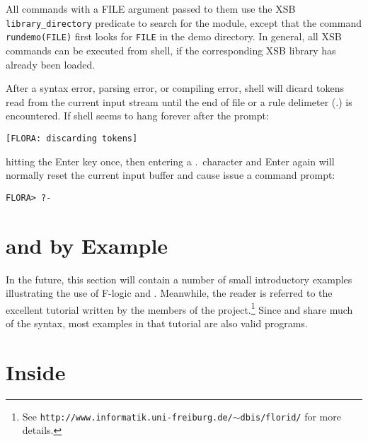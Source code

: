 \documentclass[11pt]{report}
\begin{document}
\addtocounter{footnote}{-3}
\addtocounter{footnote}{1}
\addtocounter{footnote}{1}
\addtocounter{footnote}{1}

All commands with a FILE argument passed to them use the XSB {\tt library\_directory}
predicate to search for the module, except that the command {\tt rundemo(FILE)}
first looks for {\tt FILE} in the \FLORA demo directory. In general, all XSB commands
can be executed from \FLORA shell, if the corresponding XSB library has already been
loaded.

After a syntax error, parsing error, or compiling error, \FLORA shell will
dicard tokens read from the current input stream until the end of file or a
rule delimeter (.) is encountered. If \FLORA shell seems to hang forever
after the prompt:
\begin{verbatim}
[FLORA: discarding tokens]
\end{verbatim}
hitting the Enter key once, then entering a .\ character and Enter again
will normally reset the current input buffer and cause \FLORA issue a
command prompt:
\begin{verbatim}
FLORA> ?-
\end{verbatim}

 
\section{\fl and \FLORA by Example}

In the future, this section will contain a number of small
introductory examples illustrating the use of F-logic and \FLORA. Meanwhile, the
reader is referred to the excellent tutorial written by the members of the
\FLORID project.\footnote{
  See {\tt http://www.informatik.uni-freiburg.de/$\sim$dbis/florid/} for more
  details.
  }
Since \FLORA and \FLORID share much of the syntax, most examples in that
tutorial are also valid \FLORA programs.



\section{Inside \FLORA}
\end{document}
